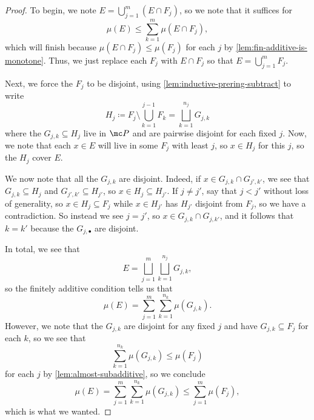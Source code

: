 \documentclass[../notes.tex]{subfiles}
\begin{document}
\begin{proof}
	To begin, we note $E=\bigcup_{j=1}^m(E\cap F_j)$, so we note that it suffices for
	\[\mu(E)\le\sum_{k=1}^m\mu(E\cap F_j),\]
	which will finish because $\mu(E\cap F_j)\le\mu(F_j)$ for each $j$ by \autoref{lem:fin-additive-is-monotone}. Thus, we just replace each $F_j$ with $E\cap F_j$ so that $E=\bigcup_{j=1}^mF_j$.
	
	Next, we force the $F_j$ to be disjoint, using \autoref{lem:inductive-prering-subtract} to write
	\[H_j\coloneqq F_j\setminus\bigcup_{k=1}^{j-1}F_k=\bigsqcup_{k=1}^{n_j}G_{j,k}\]
	where the $G_{j,k}\subseteq H_j$ live in $\mc P$ and are pairwise disjoint for each fixed $j$. Now, we note that each $x\in E$ will live in some $F_j$ with least $j$, so $x\in H_j$ for this $j$, so the $H_j$ cover $E$.

	We now note that all the $G_{j,k}$ are disjoint. Indeed, if $x\in G_{j,k}\cap G_{j',k'}$, we see that $G_{j,k}\subseteq H_j$ and $G_{j',k'}\subseteq H_{j'}$, so $x\in H_j\subseteq H_{j'}$. If $j\ne j'$, say that $j<j'$ without loss of generality, so $x\in H_j\subseteq F_j$ while $x\in H_{j'}$ has $H_{j'}$ disjoint from $F_j$, so we have a contradiction. So instead we see $j=j'$, so $x\in G_{j,k}\cap G_{j,k'}$, and it follows that $k=k'$ because the $G_{j,\bullet}$ are disjoint.

	In total, we see that
	\[E=\bigsqcup_{j=1}^m\bigsqcup_{k=1}^{n_j}G_{j,k},\]
	so the finitely additive condition tells us that
	\[\mu(E)=\sum_{j=1}^m\sum_{k=1}^{n_k}\mu(G_{j,k}).\]
	However, we note that the $G_{j,k}$ are disjoint for any fixed $j$ and have $G_{j,k}\subseteq F_j$ for each $k$, so we see that
	\[\sum_{k=1}^{n_k}\mu(G_{j,k})\le\mu(F_j)\]
	for each $j$ by \autoref{lem:almost-subadditive}, so we conclude
	\[\mu(E)=\sum_{j=1}^m\sum_{k=1}^{n_k}\mu(G_{j,k})\le\sum_{j=1}^m\mu(F_j),\]
	which is what we wanted.
\end{proof}
\end{document}
